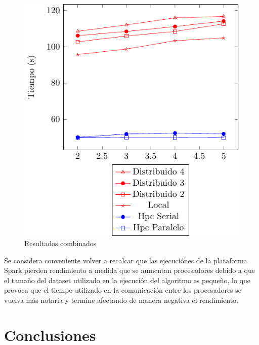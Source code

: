 \documentclass[conference,compsoc]{IEEEtran}
\begin{document}
\begin{figure}[H]
    \centering
    \includegraphics[scale=1]{ResultsCombined.pdf}
    \caption{Resultados combinados}
    \label{plot:compar}
\end{figure}

Se considera conveniente volver a recalcar que las ejecuciónes de la plataforma
Spark pierden rendimiento a medida que se aumentan procesadores debido a que el
tamaño del dataset utilizado en la ejecución del algoritmo es pequeño, lo que
provoca que el tiempo utilizado en la comunicación entre los procesadores se
vuelva más notaria y termine afectando de manera negativa el rendimiento.

\section{Conclusiones}




\end{document}
